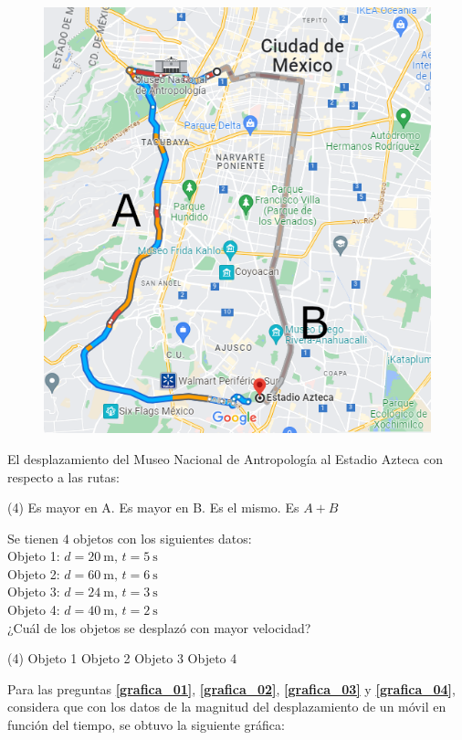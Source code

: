\documentclass[12pt, letter]{exam}
\begin{document}
\begin{questions}
\begin{figure}[H]
        \includegraphics[scale=0.5]{Imagenes/Trayectoria_04.png}
    \end{figure}
    El desplazamiento del Museo Nacional de Antropología al Estadio Azteca con respecto a las rutas:
    \begin{tasks}(4)
        \task Es mayor en A.
        \task Es mayor en B.
        \task Es el mismo.
        \task Es $A + B$
    \end{tasks}
    \question Se tienen $4$ objetos con los siguientes datos: \\
    Objeto 1: $d = \SI{20}{\meter}, \, t = \SI{5}{\second}$ \\
    Objeto 2: $d = \SI{60}{\meter}, \, t = \SI{6}{\second}$ \\
    Objeto 3: $d = \SI{24}{\meter}, \, t = \SI{3}{\second}$ \\
    Objeto 4: $d = \SI{40}{\meter}, \, t = \SI{2}{\second}$ \\[0.3em]
    ¿Cuál de los objetos se desplazó con mayor velocidad? 
    \begin{tasks}(4)
        \task Objeto 1
        \task Objeto 2
        \task Objeto 3
        \task Objeto 4        
    \end{tasks}
    Para las preguntas \textbf{\ref{grafica_01}}, \textbf{\ref{grafica_02}}, \textbf{\ref{grafica_03}} y \textbf{\ref{grafica_04}}, considera que con los datos de la magnitud del desplazamiento de un móvil en función del tiempo, se obtuvo la siguiente gráfica:

\end{questions}
\end{document}
